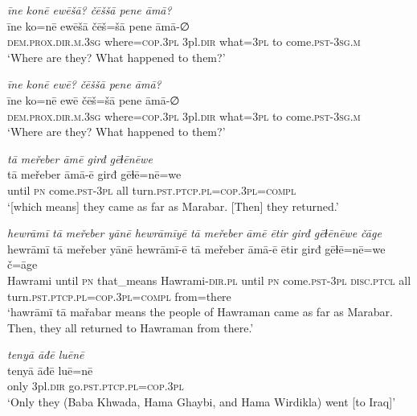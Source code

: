 \ea \label{BP.111}
\textit{īne konē ewēšā? čēššā pene āmā?} \\ 
\gll īne ko=nē ewēšā čēš=šā pene āmā-∅ \\ 
 \textsc{dem.prox}\textsc{.dir}\textsc{.m}\textsc{.3sg} where\textsc{=cop}\textsc{.3pl} 3pl\textsc{.dir} what\textsc{=3pl} to come\textsc{.pst}\textsc{-3sg}\textsc{.m} \\ 
\glt `Where are they? What happened to them?'
\z 
 
\ea \label{BP.112}
\textit{īne konē ewē? čēššā pene āmā?} \\ 
\gll īne ko=nē ewē čēš=šā pene āmā-∅ \\ 
 \textsc{dem.prox}\textsc{.dir}\textsc{.m}\textsc{.3sg} where\textsc{=cop}\textsc{.3pl} 3pl\textsc{.dir} what\textsc{=3pl} to come\textsc{.pst}\textsc{-3sg}\textsc{.m} \\ 
\glt `Where are they? What happened to them?'
\z 
 
\ea \label{BP.114}
\textit{tā meřeber āmē girđ gēɫēnēwe} \\ 
\gll tā meřeber āmā-ē girđ gēɫē=nē=we \\ 
 until \textsc{pn} come\textsc{.pst}\textsc{-3pl} all turn\textsc{.pst}\textsc{.ptcp}\textsc{.pl}\textsc{=cop}\textsc{.3pl}\textsc{=compl} \\ 
\glt `[which means] they came as far as Marabar. [Then] they returned.'
\z 
 
\ea \label{BP.115}
\textit{hewrāmī tā meřeber yānē hewrāmīyē tā meřeber āmē ētir girđ gēɫēnēwe čāge} \\ 
\gll hewrāmī tā meřeber yānē hewrāmī-ē tā meřeber āmā-ē ētir girđ gēɫē=nē=we č=āge \\ 
 Hawrami until \textsc{pn} that\_means Hawrami\textsc{-dir}\textsc{.pl} until \textsc{pn} come\textsc{.pst}\textsc{-3pl} \textsc{disc.ptcl} all turn\textsc{.pst}\textsc{.ptcp}\textsc{.pl}\textsc{=cop}\textsc{.3pl}\textsc{=compl} from=there \\ 
\glt `hawrāmī tā mařabar means the people of Hawraman came as far as Marabar. Then, they all returned to Hawraman from there.'
\z 
 
\ea \label{BP.116}
\textit{tenyā āđē luēnē} \\ 
\gll tenyā āđē luē=nē \\ 
 only 3pl\textsc{.dir} go\textsc{.pst}\textsc{.ptcp}\textsc{.pl}\textsc{=cop}\textsc{.3pl} \\ 
\glt `Only they (Baba Khwada, Hama Ghaybi, and Hama Wirdikla) went [to Iraq]'
\z 
 
